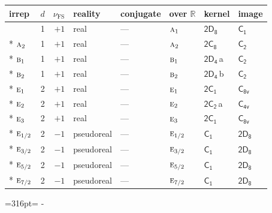 \documentclass[10pt,a4paper]{article}
\makeatletter
\def\grouprule#1#2{\noalign{\marks\LTgroupmarks{\the\belowrulesep}\nobreak\vskip#1%
  \vskip\aboverulesep}\multispan\LT@cols\unskip{\leaders\hrule\@height#2\hfill\kern\z@}\cr
  \noalign{\penalty\LTrulebreak\vskip\belowrulesep\global\@lastruleclass\z@}}
\newcommand{\needspace}[1]{\par\penalty-100\begingroup\dimen0=#1\relax\dimen2=\pagegoal
  \advance\dimen2-\pagetotal\ifdim\dimen0>\dimen2\relax\ifdim\dimen2>0pt\vfil\break\fi\fi
  \endgroup}
\numberwithin{equation}{section}
\newcommand{\grp}[1]{\mathsf{#1}}
\newcommand{\irr}[1]{\text{\normalfont\scshape #1}}
\newcommand{\detbox}[1]{{\setlength{\fboxsep}{1pt}\fbox{#1}}}
\newcommand{\clsletter}[1]{\,{\scriptsize\color{black!55}#1}}
\newcommand{\fsind}{\nu_{\mathrm{FS}}}
\makeatother
\begin{document}
\setlength{\emergencystretch}{2em}\par\setlength{\emergencystretch}{0pt}
{\small\renewcommand{\arraystretch}{1.25}\setlength{\tabcolsep}{4pt}\begin{longtable}{@{}lrrlllll@{}}\toprule
irrep & $d$ & $\fsind$ & reality & conjugate & over $\mathbb{R}$ & kernel & image\\\midrule\endhead
\bottomrule\endfoot\endlastfoot
\detbox{$\irr{a}_{1}$} & 1 & $+1$ & real & --- & $\irr{a}_{1}$ & \href{2D8.pdf}{$\grp{2D_{8}}$} & \href{../../../rotation/data/pdf/C1.pdf}{$\grp{C_{1}}$}\\*
$\irr{a}_{2}$ & 1 & $+1$ & real & --- & $\irr{a}_{2}$ & \href{2C8.pdf}{$\grp{2C_{8}}$} & \href{../../../rotation/data/pdf/C2.pdf}{$\grp{C_{2}}$}\\*
$\irr{b}_{1}$ & 1 & $+1$ & real & --- & $\irr{b}_{1}$ & \href{2D4.pdf}{$\grp{2D_{4}}$}\clsletter{a} & \href{../../../rotation/data/pdf/C2.pdf}{$\grp{C_{2}}$}\\*
$\irr{b}_{2}$ & 1 & $+1$ & real & --- & $\irr{b}_{2}$ & \href{2D4.pdf}{$\grp{2D_{4}}$}\clsletter{b} & \href{../../../rotation/data/pdf/C2.pdf}{$\grp{C_{2}}$}\\*
$\irr{e}_{1}$ & 2 & $+1$ & real & --- & $\irr{e}_{1}$ & \href{2C1.pdf}{$\grp{2C_{1}}$} & \href{../../../rotation/data/pdf/C8v.pdf}{$\grp{C_{8v}}$}\\*
$\irr{e}_{2}$ & 2 & $+1$ & real & --- & $\irr{e}_{2}$ & \href{2C2.pdf}{$\grp{2C_{2}}$}\clsletter{a} & \href{../../../rotation/data/pdf/C4v.pdf}{$\grp{C_{4v}}$}\\*
$\irr{e}_{3}$ & 2 & $+1$ & real & --- & $\irr{e}_{3}$ & \href{2C1.pdf}{$\grp{2C_{1}}$} & \href{../../../rotation/data/pdf/C8v.pdf}{$\grp{C_{8v}}$}\\*
\grouprule{0pt}{\lightrulewidth}
$\irr{e}_{1/2}$ & 2 & $-1$ & pseudoreal & --- & $\irr{e}_{1/2}$ & \href{C1.pdf}{$\grp{C_{1}}$} & \href{2D8.pdf}{$\grp{2D_{8}}$}\\*
$\irr{e}_{3/2}$ & 2 & $-1$ & pseudoreal & --- & $\irr{e}_{3/2}$ & \href{C1.pdf}{$\grp{C_{1}}$} & \href{2D8.pdf}{$\grp{2D_{8}}$}\\*
$\irr{e}_{5/2}$ & 2 & $-1$ & pseudoreal & --- & $\irr{e}_{5/2}$ & \href{C1.pdf}{$\grp{C_{1}}$} & \href{2D8.pdf}{$\grp{2D_{8}}$}\\*
$\irr{e}_{7/2}$ & 2 & $-1$ & pseudoreal & --- & $\irr{e}_{7/2}$ & \href{C1.pdf}{$\grp{C_{1}}$} & \href{2D8.pdf}{$\grp{2D_{8}}$}\\
\bottomrule\end{longtable}}
\needspace{316pt}
\end{document}

